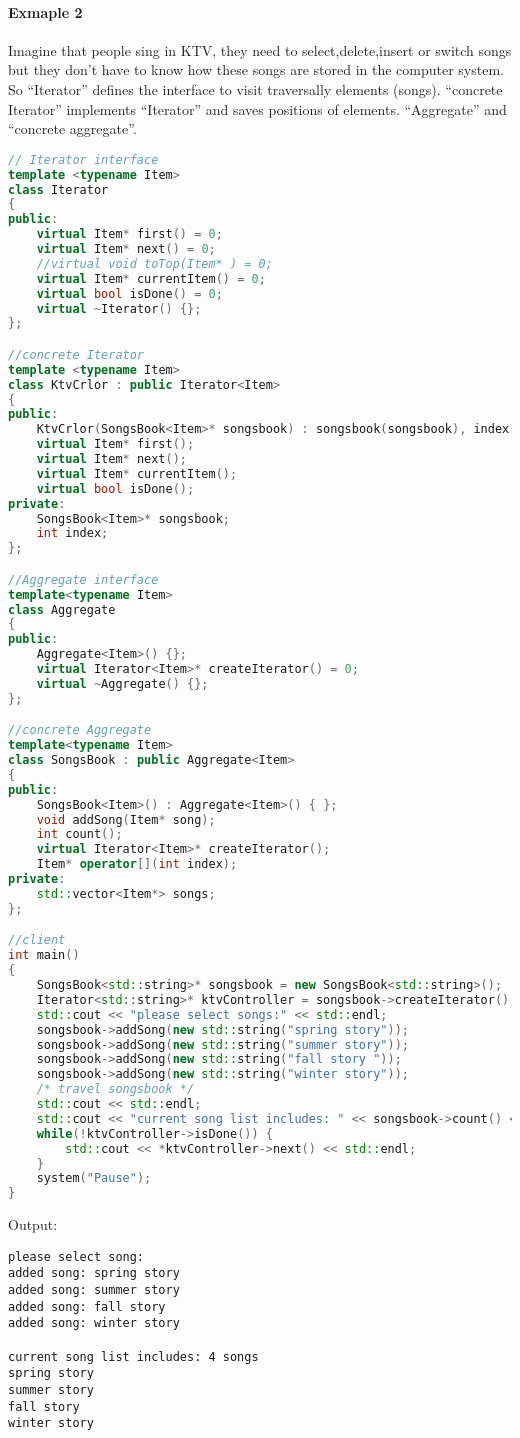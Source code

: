 \documentclass{book}
\begin{document}
\paragraph{Exmaple 2} Imagine that people sing in KTV, they need to select,delete,insert or switch songs but they don't have to know how these songs are stored in the computer system.
So ``Iterator'' defines the interface to visit traversally elements (songs). ``concrete Iterator'' implements ``Iterator'' and saves positions of elements.
``Aggregate'' and ``concrete aggregate''.

\begin{lstlisting}[caption={Iterator Pattern Example 2 (VC)},language=C++]
// Iterator interface
template <typename Item>  
class Iterator  
{  
public:  
    virtual Item* first() = 0;  
    virtual Item* next() = 0;  
    //virtual void toTop(Item* ) = 0;  
    virtual Item* currentItem() = 0;  
    virtual bool isDone() = 0;  
    virtual ~Iterator() {};  
};  

//concrete Iterator
template <typename Item>  
class KtvCrlor : public Iterator<Item>  
{  
public:  
    KtvCrlor(SongsBook<Item>* songsbook) : songsbook(songsbook), index(0) { }  
    virtual Item* first();  
    virtual Item* next();  
    virtual Item* currentItem();  
    virtual bool isDone();  
private:  
    SongsBook<Item>* songsbook;  
    int index;  
};  

//Aggregate interface
template<typename Item>  
class Aggregate  
{  
public:  
    Aggregate<Item>() {};  
    virtual Iterator<Item>* createIterator() = 0;  
    virtual ~Aggregate() {};  
};  

//concrete Aggregate
template<typename Item>  
class SongsBook : public Aggregate<Item>  
{  
public:  
    SongsBook<Item>() : Aggregate<Item>() { };  
    void addSong(Item* song);  
    int count();  
    virtual Iterator<Item>* createIterator();  
    Item* operator[](int index);  
private:  
    std::vector<Item*> songs;  
};  

//client
int main()  
{  
    SongsBook<std::string>* songsbook = new SongsBook<std::string>();  
    Iterator<std::string>* ktvController = songsbook->createIterator();  
    std::cout << "please select songs:" << std::endl;  
    songsbook->addSong(new std::string("spring story"));  
    songsbook->addSong(new std::string("summer story"));  
    songsbook->addSong(new std::string("fall story "));  
    songsbook->addSong(new std::string("winter story"));  
    /* travel songsbook */  
    std::cout << std::endl;  
    std::cout << "current song list includes: " << songsbook->count() << " songs " << std::endl;  
    while(!ktvController->isDone()) {  
        std::cout << *ktvController->next() << std::endl;  
    }  
    system("Pause");  
}  
\end{lstlisting}
Output:
\begin{verbatim}
please select song:
added song: spring story
added song: summer story
added song: fall story
added song: winter story

current song list includes: 4 songs
spring story
summer story
fall story
winter story
\end{verbatim}
\end{document}
